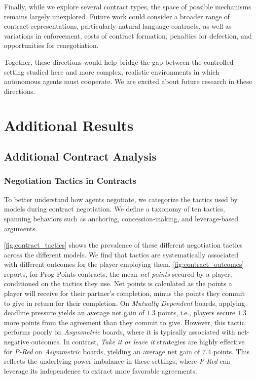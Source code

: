 \documentclass{article} %
\newcommand{\PPC}{Prog-Points\xspace}
\begin{document}
Finally, while we explore several contract types, the space of possible mechanisms remains largely unexplored. Future work could consider a broader range of contract representations, particularly natural language contracts, as well as variations in enforcement, costs of contract formation, penalties for defection, and opportunities for renegotiation.

Together, these directions would help bridge the gap between the controlled setting studied here and more complex, realistic environments in which autonomous agents must cooperate. We are excited about future research in these directions.

\section{Additional Results}
\label{sec:additional_results}

\subsection{Additional Contract Analysis}
\subsubsection{Negotiation Tactics in Contracts}
\label{appendix:Negotiation_Tactics}

To better understand how agents negotiate, we categorize the tactics used by models during contract negotiation. We define a taxonomy of ten tactics, spanning behaviors such as anchoring, concession-making, and leverage-based arguments.

 \cref{fig:contract_tactics} shows the prevalence of these different negotiation tactics across the different models. We find that tactics are systematically associated with different outcomes for the player employing them.
\cref{fig:contract_outcomes} reports, for \PPC contracts, the mean \textit{net points} secured by a player, conditioned on the tactics they use. Net points is calculated as the points a player will receive for their partner’s completion, minus the points they commit to give in return for their completion. On \textit{Mutually Dependent} boards, applying deadline pressure yields an average net gain of $1.3$ points, i.e., players secure $1.3$ more points from the agreement than they commit to give. However, this tactic performs poorly on \textit{Asymmetric} boards, where it is typically associated with net-negative outcomes. In contrast, \textit{Take it or leave it} strategies are highly effective for \textit{P-Red} on \textit{Asymmetric} boards, yielding an average net gain of $7.4$ points. This reflects the underlying power imbalance in these settings, where \textit{P-Red} can leverage its independence to extract more favorable agreements.
\end{document}
